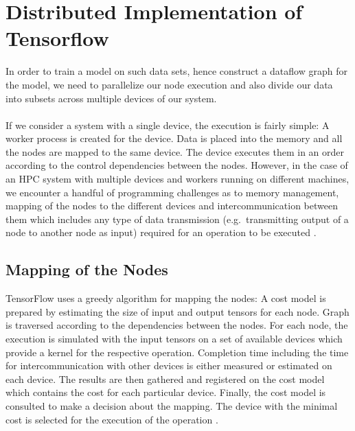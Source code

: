 \documentclass[ieeetran]{article}
\begin{document}
\section{Distributed Implementation of Tensorflow} %
\label{sec:multiple_device_execution_of_a_graph}
In order to train a model on such data sets, hence construct a dataflow graph for the model, we need to parallelize our node execution and also divide our data into subsets across multiple devices of our system.
\\ \\If we consider a system with a single device, the execution is fairly simple: A worker process is created for the device. Data is placed into the memory and all the nodes are mapped to the same device. The device executes them in an order according to the control dependencies between the nodes. However, in the case of an HPC system with multiple devices and workers running on different machines, we encounter a handful of programming challenges as to memory management, mapping of the nodes to the different devices and intercommunication between them which includes any type of data transmission (e.g.\ transmitting output of a node to another node as input) required for an operation to be executed \cite{first}.

\subsection{Mapping of the Nodes} %
\label{sub:mapping_of_nodes} 
TensorFlow uses a greedy algorithm for mapping the nodes: A cost model is prepared by estimating the size of input and output tensors for each node. Graph is traversed according to the dependencies between the nodes. For each node, the execution is simulated with the input tensors on a set of available devices which provide a kernel for the respective operation. Completion time including the time for intercommunication with other devices is either measured or estimated on each device. The results are then gathered and registered on the cost model which contains the cost for each particular device. Finally, the cost model is consulted to make a decision about the mapping. The device with the minimal cost is selected for the execution of the operation \cite{first}.
\end{document}
